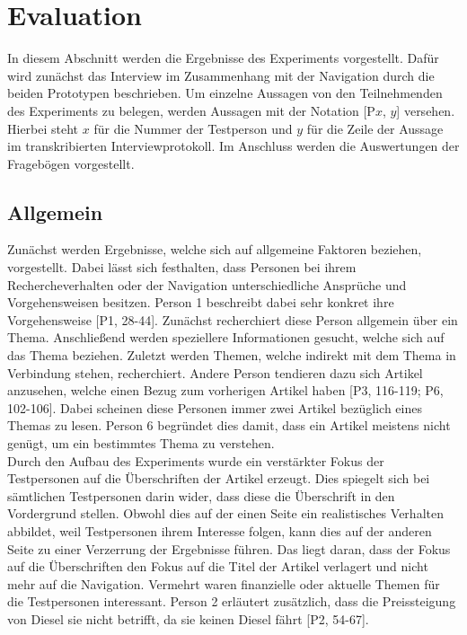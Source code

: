 \section{Evaluation}\label{sec:results}
In diesem Abschnitt werden die Ergebnisse des Experiments vorgestellt.
Dafür wird zunächst das Interview im Zusammenhang mit der Navigation durch die beiden Prototypen beschrieben.
Um einzelne Aussagen von den Teilnehmenden des Experiments zu belegen, werden Aussagen mit der Notation [P$x$, $y$] versehen.
Hierbei steht $x$ für die Nummer der Testperson und $y$ für die Zeile der Aussage im transkribierten Interviewprotokoll.
Im Anschluss werden die Auswertungen der Fragebögen vorgestellt.

\subsection{Allgemein}
Zunächst werden Ergebnisse, welche sich auf allgemeine Faktoren beziehen, vorgestellt.
Dabei lässt sich festhalten, dass Personen bei ihrem Rechercheverhalten oder der Navigation unterschiedliche Ansprüche und Vorgehensweisen besitzen.
Person 1 beschreibt dabei sehr konkret ihre Vorgehensweise [P1, 28-44].
Zunächst recherchiert diese Person allgemein über ein Thema.
Anschließend werden speziellere Informationen gesucht, welche sich auf das Thema beziehen.
Zuletzt werden Themen, welche indirekt mit dem Thema in Verbindung stehen, recherchiert.
Andere Person tendieren dazu sich Artikel anzusehen, welche einen Bezug zum vorherigen Artikel haben [P3, 116-119; P6, 102-106].
Dabei scheinen diese Personen immer zwei Artikel bezüglich eines Themas zu lesen.
Person 6 begründet dies damit, dass ein Artikel meistens nicht genügt, um ein bestimmtes Thema zu verstehen.\\

Durch den Aufbau des Experiments wurde ein verstärkter Fokus der Testpersonen auf die Überschriften der Artikel erzeugt.
Dies spiegelt sich bei sämtlichen Testpersonen darin wider, dass diese die Überschrift in den Vordergrund stellen.
Obwohl dies auf der einen Seite ein realistisches Verhalten abbildet, weil Testpersonen ihrem Interesse folgen, kann dies auf der anderen Seite zu einer Verzerrung der Ergebnisse führen.
Das liegt daran, dass der Fokus auf die Überschriften den Fokus auf die Titel der Artikel verlagert und nicht mehr auf die Navigation.
Vermehrt waren finanzielle oder aktuelle Themen für die Testpersonen interessant.
Person 2 erläutert zusätzlich, dass die Preissteigung von Diesel sie nicht betrifft, da sie keinen Diesel fährt [P2, 54-67].\\

